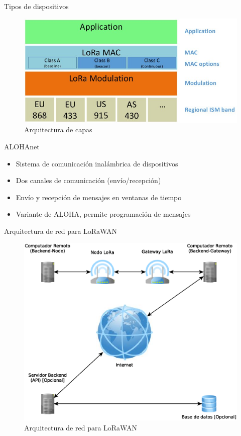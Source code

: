 \documentclass[10pt]{beamer}
\begin{document}
\begin{frame}[fragile]{Tipos de dispositivos}
\begin{figure}
\begin{overprint}
\hspace{2cm}\centering\includegraphics[scale=0.4]{imagenes/capaslora}\caption{Arquitectura de capas}
\end{overprint}
\end{figure}
\end{frame}
%
\begin{frame}[fragile]{ALOHAnet}
\begin{itemize}
\item Sistema de comunicación inalámbrica de dispositivos
\item Dos canales de comunicación (envío/recepción)
\item Envío y recepción de mensajes en ventanas de tiempo
\item Variante de ALOHA, permite programación de mensajes
\end{itemize}
\end{frame}
\begin{frame}[fragile]{Arquitectura de red para LoRaWAN}
\begin{figure}
\centering\includegraphics[scale=0.37]{imagenes/arquilora.eps}\caption{Arquitectura de red para LoRaWAN}
\end{figure}
\end{frame}
\end{document}
